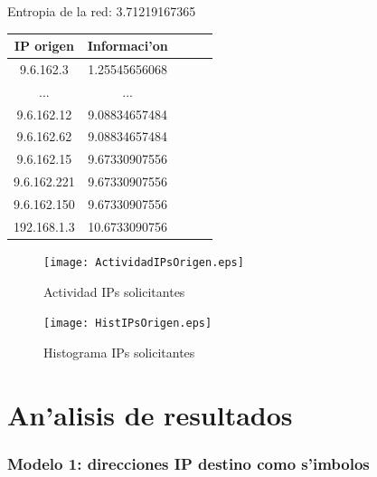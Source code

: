 \documentclass[a4paper,10pt]{article}
\begin{document}
Entropia de la red: 3.71219167365	\\

\noindent \begin{tabular}{| c | c | c | c | r} \hline
IP origen	&	Informaci'on	\\	\hline
9.6.162.3	 & 	1.25545656068	 \\ \hline 
...	&	...	\\ \hline
9.6.162.12	 & 	9.08834657484	 \\ \hline 
9.6.162.62	 & 	9.08834657484	 \\ \hline 
9.6.162.15	 & 	9.67330907556	 \\ \hline 
9.6.162.221	 & 	9.67330907556	 \\ \hline 
9.6.162.150	 & 	9.67330907556	 \\ \hline 
192.168.1.3	 & 	10.6733090756	 \\ \hline 
\end{tabular}	

\newpage

\begin{figure}[!hbp]
\begin{center}
\texttt{[image: ActividadIPsOrigen.eps]}
\end{center}
\caption{Actividad IPs solicitantes} \label{figura4}
\end{figure}

\begin{figure}[!hbp]
\begin{center}
\texttt{[image: HistIPsOrigen.eps]}
\end{center}
\caption{Histograma IPs solicitantes} \label{figura5}
\end{figure}

\newpage

\clearpage

\section{An'alisis de resultados}
\label{analisis1:}

\subsubsection{Modelo 1: direcciones IP destino como s'imbolos}
\end{document}
